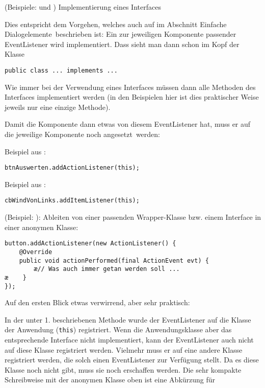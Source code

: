\begin{compactenum}[1.] 
\item (Beispiele:  und ) Implementierung
eines Interfaces

Dies entspricht dem Vorgehen, welches auch auf im Abschnitt
\glqq Einfache Dialogelemente\grqq\ beschrieben ist: Ein zur jeweiligen
Komponente passender EventListener wird implementiert. Dass sieht man dann schon im Kopf der 
Klasse

\begin{lstlisting}
public class ... implements ... 
\end{lstlisting}

Wie immer bei der Verwendung eines Interfaces müssen dann alle Methoden des 
Interfaces implementiert werden (in den Beispielen hier ist dies praktischer
Weise jeweils nur eine einzige Methode).

Damit die Komponente dann etwas von diesem EventListener hat, muss er auf die 
jeweilige Komponente noch \glqq angesetzt\grqq\ werden:

Beispiel aus :  

\begin{lstlisting}
btnAuswerten.addActionListener(this);
\end{lstlisting}

Beispiel aus :

\begin{lstlisting}
cbWindVonLinks.addItemListener(this);
\end{lstlisting}

  
\item (Beispiel: ): Ableiten von einer passenden
Wrapper-Klasse bzw. einem Interface in einer anonymen Klasse:
   
\begin{lstlisting}
button.addActionListener(new ActionListener() {
    @Override
    public void actionPerformed(final ActionEvent evt) {
        æ// Was auch immer getan werden soll ...
æ    }
});
\end{lstlisting}
   		
   
Auf den ersten Blick etwas verwirrend, aber sehr praktisch:

In der unter 1. beschriebenen Methode wurde der EventListener auf die
Klasse der Anwendung (\lstinline|this|) registriert. Wenn die
Anwendungsklasse aber das entsprechende Interface nicht implementiert, kann der
EventListener auch nicht auf diese Klasse registriert werden. Vielmehr muss
er auf eine andere Klasse registriert werden, die solch einen EventListener zur
Verfügung stellt. Da es diese Klasse noch nicht gibt, muss sie noch erschaffen
werden. Die sehr kompakte Schreibweise mit der anonymen Klasse oben ist eine
Abkürzung für


\end{compactenum}
